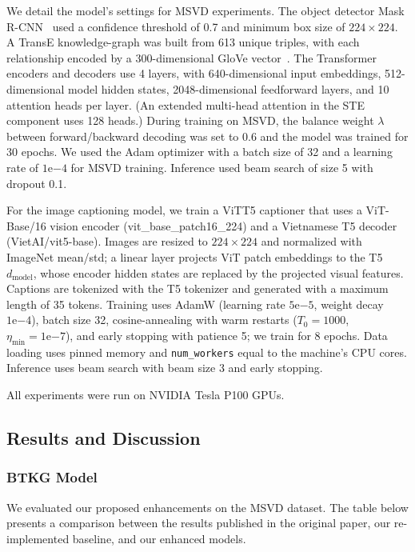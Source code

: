 We detail the model's settings for MSVD experiments. The object detector Mask R-CNN~\cite{he2017mask} used a confidence threshold of 0.7 and minimum box size of \(224\times224\). A TransE knowledge-graph was built from 613 unique triples, with each relationship encoded by a 300-dimensional GloVe vector~\cite{pennington-etal-2014-glove}. The Transformer encoders and decoders use 4 layers, with 640-dimensional input embeddings, 512-dimensional model hidden states, 2048-dimensional feedforward layers, and 10 attention heads per layer. (An extended multi-head attention in the STE component uses 128 heads.) During training on MSVD, the balance weight $\lambda$ between forward/backward decoding was set to 0.6 and the model was trained for 30 epochs. We used the Adam optimizer with a batch size of 32 and a learning rate of \(1\mathrm{e}{-4}\) for MSVD training. Inference used beam search of size 5 with dropout 0.1. 

For the image captioning model, we train a ViT\textendash T5 captioner that uses a ViT-Base/16 vision encoder (vit\_base\_patch16\_224) and a Vietnamese T5 decoder (VietAI/vit5-base). Images are resized to \(224\times224\) and normalized with ImageNet mean/std; a linear layer projects ViT patch embeddings to the T5 \(d_{\mathrm{model}}\), whose encoder hidden states are replaced by the projected visual features. Captions are tokenized with the T5 tokenizer and generated with a maximum length of 35 tokens. Training uses AdamW (learning rate \(5\mathrm{e}{-5}\), weight decay \(1\mathrm{e}{-4}\)), batch size 32, cosine-annealing with warm restarts (\(T_0{=}1000\), \(\eta_{\min}{=}1\mathrm{e}{-7}\)), and early stopping with patience 5; we train for 8 epochs. Data loading uses pinned memory and \texttt{num\_workers} equal to the machine's CPU cores. Inference uses beam search with beam size 3 and early stopping. 

All experiments were run on NVIDIA Tesla P100 GPUs.


\subsection{Results and Discussion}

\subsubsection{BTKG Model}

We evaluated our proposed enhancements on the MSVD dataset. The table below presents a comparison between the results published in the original paper, our re-implemented baseline, and our enhanced models.

